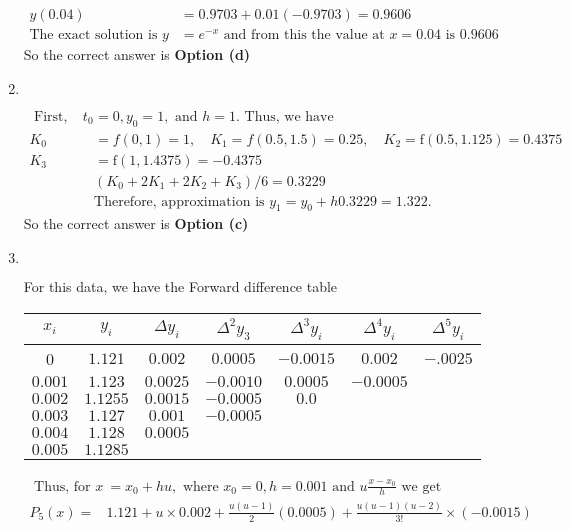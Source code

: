 \begin{enumerate}
\begin{answer}
\begin{align*}
	y(0.04)&=0.9703+0.01(-0.9703)=0.9606\\
	\text{The exact solution is }y&=e^{-x}\text{ and from this the value at }x=0.04\text{ is } 0.9606
	\end{align*}
		So the correct answer is \textbf{Option (d)}
\end{answer}
	\item  $\left. \right. $
	\begin{answer}
		\begin{align*}
	\text{	First, let }t_{0}&=0, y_{0}=1,\text{ and }h=1.\text{ Thus, we have}\\
	K_{0}&=f(0,1)=1, \quad K_{1}=f(0.5,1.5)=0.25, \quad K_{2}=\mathrm{f}(0.5,1.125)=0.4375 \\
	K_{3}&=\mathrm{f}(1,1.4375)=-0.4375 \\
	&\left(K_{0}+2 K_{1}+2 K_{2}+K_{3}\right) / 6=0.3229\\
	&\text{Therefore, approximation is }y_{1}=y_{0}+h 0.3229=1.322.
		\end{align*}
			So the correct answer is \textbf{Option (c)}
	\end{answer}
		\item  $\left. \right. $
	\begin{answer}
		For this data, we have the Forward difference table\\
		\begin{tabular}{|c|c|c|c|c|c|c|}
		\hline$x_{i}$ & $y_{i}$ & $\Delta y_{i}$ & $\Delta^{2} y_{3}$ & $\Delta^{3} y_{i}$ & $\Delta^{4} y_{i}$ & $\Delta^{5} y_{i}$ \\
		\hline 0 & $1.121$ & $0.002$ & $0.0005$ & $-0.0015$ & $0.002$ & $-.0025$ \\
		\hline $0.001$ & $1.123$ & $0.0025$ & $-0.0010$ & $0.0005$ & $-0.0005$ & \\
		\hline $0.002$ & $1.1255$ & $0.0015$ & $-0.0005$ & $0.0$ & & \\
		\hline $0.003$ & $1.127$ & $0.001$ & $-0.0005$ & & & \\
		\hline $0.004$ & $1.128$ & $0.0005$ & & & & \\
		\hline $0.005$ & $1.1285$ & & & & & \\
		\hline
		\end{tabular}
		\begin{align*}
	\text{	Thus, for }x&=x_{0}+h u,\text{ where }x_{0}=0, h=0.001\text{ and }u \frac{x-x_{0}}{h}\text{ we get}\\
		P_{5}(x)=& 1.121+u \times 0.002+\frac{u(u-1)}{2}(0.0005)+\frac{u(u-1)(u-2)}{3 !} \times(-0.0015) \\

\end{align*}
\end{answer}
\end{enumerate}
